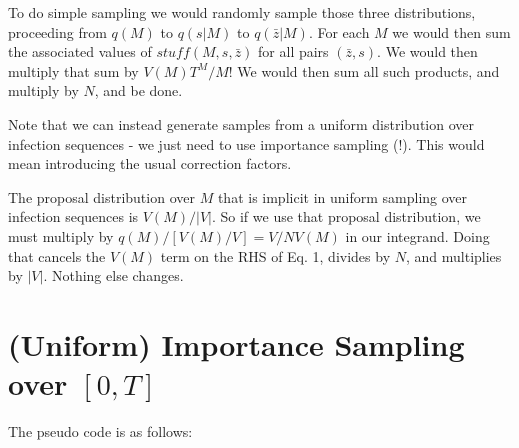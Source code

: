 \documentclass{article}
\begin{document}
        To do simple sampling we would randomly sample those three distributions,
        proceeding from $q(M)$ to $q(s | M)$ to $q(\bar{z} | M)$. For each $M$ we would
        then sum the associated values of $stuff(M, s, \bar{z})$ for all pairs $(\bar{z}, s)$.
        We would then multiply that sum by $V(M)T^M / M!$
        We would then sum all such products, and multiply by $N$, and be done.

        Note that we can instead generate samples from a uniform distribution over
        infection sequences   -  we just need to use importance sampling (!). This would mean
        introducing the usual correction factors.
 
        The proposal distribution over $M$ that is implicit in uniform sampling over infection sequences is
        $V(M) / |V|$. So if we use that proposal distribution, we must multiply by
        $q(M) / [V(M) / V] = V / NV(M)$ in our integrand. Doing that cancels the $V(M)$
        term on the RHS of Eq. 1, divides by $N$, and multiplies by $|V|$. Nothing else changes.


\pagebreak

\section{(Uniform) Importance Sampling over $[0, T]$ }

The pseudo code is as follows:
\end{document}
